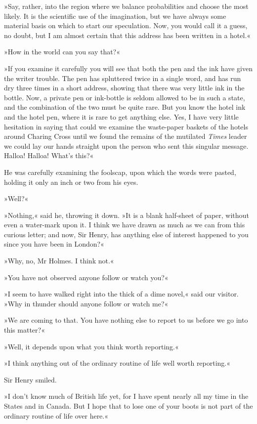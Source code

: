 »Say, rather, into the region where we balance probabilities and choose the most likely. It is the scientific use of the imagination, but we have always some material basis on which to start our speculation. Now, you would call it a guess, no doubt, but I am almost certain that this address has been written in a hotel.«

»How in the world can you say that?«

»If you examine it carefully you will see that both the pen and the ink have given the writer trouble. The pen has spluttered twice in a single word, and has run dry three times in a short address, showing that there was very little ink in the bottle. Now, a private pen or ink-bottle is seldom allowed to be in such a state, and the combination of the two must be quite rare. But you know the hotel ink and the hotel pen, where it is rare to get anything else. Yes, I have very little hesitation in saying that could we examine the waste-paper baskets of the hotels around Charing Cross until we found the remains of the mutilated \textit{Times} leader we could lay our hands straight upon the person who sent this singular message. Halloa! Halloa! What's this?«

He was carefully examining the foolscap, upon which the words were pasted, holding it only an inch or two from his eyes.

»Well?«

»Nothing,« said he, throwing it down. »It is a blank half-sheet of paper, without even a water-mark upon it. I think we have drawn as much as we can from this curious letter; and now, Sir Henry, has anything else of interest happened to you since you have been in London?«

»Why, no, Mr Holmes. I think not.«

»You have not observed anyone follow or watch you?«

»I seem to have walked right into the thick of a dime novel,« said our visitor. »Why in thunder should anyone follow or watch me?«

»We are coming to that. You have nothing else to report to us before we go into this matter?«

»Well, it depends upon what you think worth reporting.«

»I think anything out of the ordinary routine of life well worth reporting.«

Sir Henry smiled.

»I don't know much of British life yet, for I have spent nearly all my time in the States and in Canada. But I hope that to lose one of your boots is not part of the ordinary routine of life over here.«

